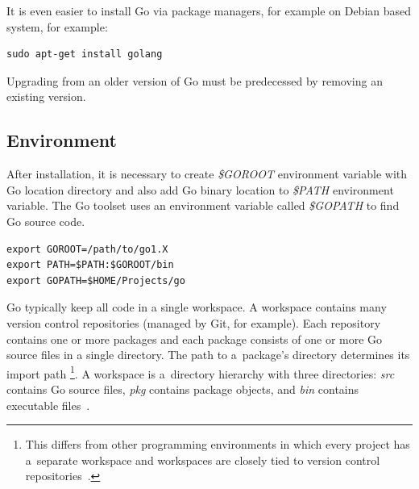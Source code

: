 \documentclass[
  12pt, 
  digital, %
  notable,   %
  nolof,     %
  nolot,     %
]{fithesis3}
\begin{document}
It is even easier to install Go via package managers, for example on Debian based system, for example:
\begin{lstlisting}
sudo apt-get install golang
\end{lstlisting}
Upgrading from an older version of Go must be predecessed by removing an existing version. 

\subsection{Environment}
After installation, it is necessary to create \textit{\$GOROOT} environment variable with Go location directory and also add Go binary location to \textit{\$PATH} environment variable. The Go 
toolset uses an environment variable called \textit{\$GOPATH} to find Go source code. 

\begin{lstlisting}
export GOROOT=/path/to/go1.X
export PATH=$PATH:$GOROOT/bin
export GOPATH=$HOME/Projects/go
\end{lstlisting}
Go typically keep all code in a single workspace. A workspace contains many version control 
repositories (managed by Git, for example). Each repository contains one or more packages and each 
package consists of one or more Go source files in a single directory. The path to a~package's 
directory determines its import path \footnote{This differs from other programming environments in 
which every project has a~separate workspace and workspaces are closely tied to version control 
repositories~\cite{howtowritegocode}.}. A workspace is a~directory hierarchy with three 
directories: \textit{src} contains Go source files, \textit{pkg} contains package objects, and \textit{bin} contains executable files~\cite{howtowritegocode}. %

\end{document}
